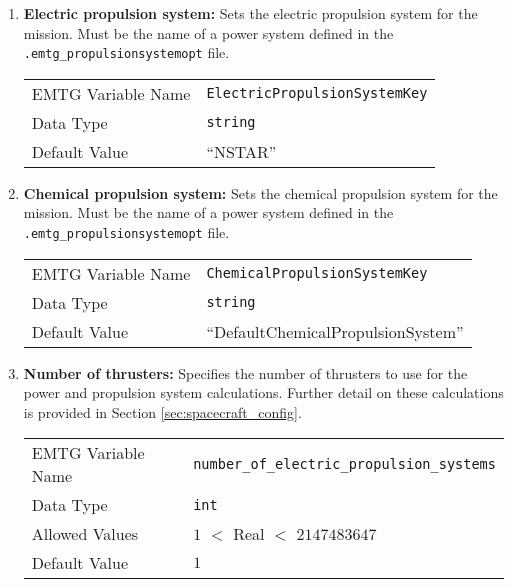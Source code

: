\begin{enumerate}
    \item \textbf{Electric propulsion system:} Sets the electric propulsion system for the mission. Must be the name of a power system defined in the {\tt .emtg\_propulsionsystemopt} file.
    \begin{table}[H]
        \hspace{2cm}
        \begin{tabular}{lp{5cm}}
        \ac{EMTG} Variable Name & \verb|ElectricPropulsionSystemKey| \\
        Data Type & \verb|string| \\
        Default Value & ``NSTAR'' \\
        \end{tabular}
    \end{table}
    
    \item \textbf{Chemical propulsion system:} Sets the chemical propulsion system for the mission. Must be the name of a power system defined in the {\tt .emtg\_propulsionsystemopt} file.
    \begin{table}[H]
        \hspace{2cm}
        \begin{tabular}{lp{5cm}}
        \ac{EMTG} Variable Name & \verb|ChemicalPropulsionSystemKey| \\
        Data Type & \verb|string| \\
        Default Value & ``DefaultChemicalPropulsionSystem'' \\
        \end{tabular}
    \end{table}
    
    \item \textbf{Number of thrusters:} Specifies the number of thrusters to use for the power and propulsion system calculations. Further detail on these calculations is provided in Section \ref{sec:spacecraft_config}.
    \begin{table}[H]
        \hspace{2cm}
        \begin{tabular}{lp{5cm}}
        \ac{EMTG} Variable Name & \verb|number_of_electric_propulsion_systems| \\
        Data Type & \verb|int| \\
        Allowed Values & $1$ $<$ Real $<$ $2147483647$ \\
        Default Value & $1$ \\
        \end{tabular}
    \end{table}
    

\end{enumerate}
